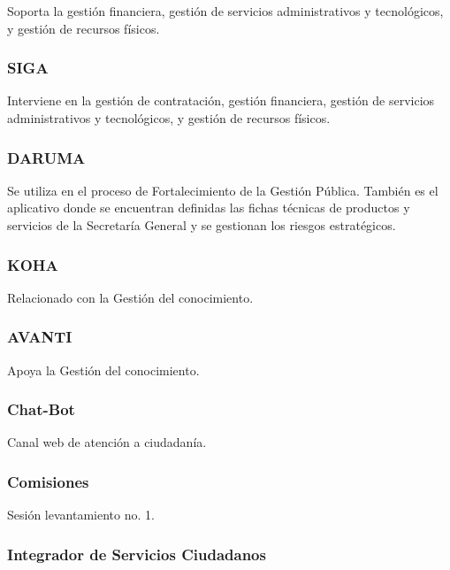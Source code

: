 \documentclass[
	a4paper, %
	12pt, %
]{include/CSSullivanBusinessReport}
\begin{document}
Soporta la gestión financiera, gestión de servicios administrativos y
tecnológicos, y gestión de recursos físicos.

\subsubsection{SIGA}\label{sec:siga}

Interviene en la gestión de contratación, gestión financiera, gestión de
servicios administrativos y tecnológicos, y gestión de recursos físicos.

\subsubsection{DARUMA}\label{sec:daruma}

Se utiliza en el proceso de Fortalecimiento de la Gestión Pública.
También es el aplicativo donde se encuentran definidas las fichas
técnicas de productos y servicios de la Secretaría General y se
gestionan los riesgos estratégicos.

\subsubsection{KOHA}\label{sec:koha}

Relacionado con la Gestión del conocimiento.

\subsubsection{AVANTI}\label{sec:avanti}

Apoya la Gestión del conocimiento.

\subsubsection{Chat-Bot}\label{sec:chat-bot}

Canal web de atención a ciudadanía.

\subsubsection{Comisiones}\label{sec:comisiones}

Sesión levantamiento no. 1.

\subsubsection{Integrador de Servicios
Ciudadanos}\label{sec:integrador-de-servicios-ciudadanos}
\end{document}
